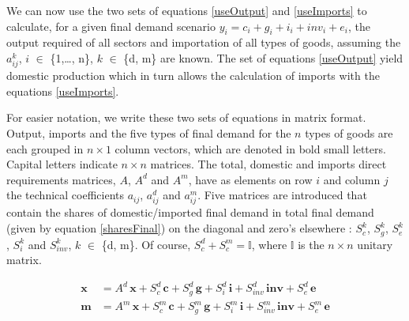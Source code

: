 \documentclass[12pt,english]{article}
\begin{document}

We can now use the two sets of equations \ref{useOutput} and \ref{useImports} to calculate, for a given final demand scenario $y_i= c_i + g_i + i_i + inv_i + e_i$, the output required of all sectors and importation of all types of goods, assuming the $a_{ij}^k$, $i$ $\in$ \{1,\ldots, n\}, $k$ $\in$ \{d, m\} are known.
The set of equations \ref{useOutput} yield domestic production which in turn allows the calculation of imports with the equations \ref{useImports}. 

For easier notation, we write these two sets of equations in matrix format. Output, imports and the five types of final demand for the $n$ types of goods are each grouped in $n \times 1$ column vectors, which are denoted in bold small letters. Capital letters indicate $n \times n$ matrices. The total, domestic and imports direct requirements matrices, $A$, $A^d$ and $A^m$, have as elements on row $i$ and column $j$ the technical coefficients $a_{ij}$, $a^d_{ij}$ and $a^m_{ij}$. Five matrices are introduced that contain the shares of domestic/imported final demand in total final demand (given by equation \ref{sharesFinal}) on the diagonal and zero's elsewhere  : $S^k_{c}$, $S^k_{g}$, $S^k_{e}$, $S^k_{i}$ and $S^k_{inv}$, $k$ $\in$ \{d, m\}. Of course, $S^d_{c} + S^m_{c} = \mathbb{I}$, where $\mathbb{I}$ is the $n \times n$ unitary matrix.

\begin{align}
\boldsymbol{x} &= A^d\,  \boldsymbol{x} + S^d_{c} \, \boldsymbol{c} + S^d_{g} \, \boldsymbol{g} + S^d_{i} \, \boldsymbol{i} + S^d_{inv} \, \boldsymbol{inv} + S^d_{e}\,  \boldsymbol{e} \label{useOutputsDom} \\
\boldsymbol{m} &= A^m \, \boldsymbol{x} + S^m_{c} \,\boldsymbol{c} + S^m_{g}\, \boldsymbol{g} + S^m_{i}\, \boldsymbol{i} + S^m_{inv}\, \boldsymbol{inv} + S^m_{e}\, \boldsymbol{e} \label{useOutputsImport} 
\end{align}
\end{document}
